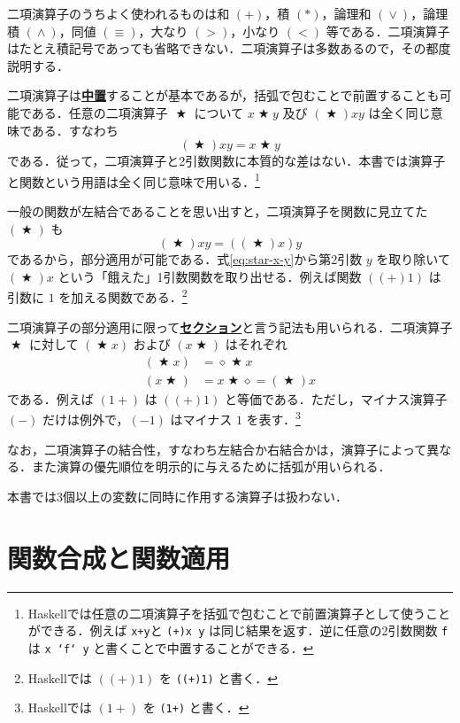\documentclass[a4paper,twocolumn]{jsbook}
\newcommand{\programminglanguage}[1]{\textsf{#1}}
\newcommand{\haskell}{\programminglanguage{Haskell}}
\newcommand{\keyword}[1]{{\underline{\textbf{#1}}}}
\newcommand{\code}[1]{\texttt{#1}}
\newcommand{\mAnonParam}{\diamond}
\DeclareMathOperator{\mBinOp}{\bigstar}
\DeclareMathOperator{\mLogicalAnd}{\wedge}
\DeclareMathOperator{\mLogicalOr}{\vee}
\begin{document}
二項演算子のうちよく使われるものは和 $(+)$，積 $(*)$，論理和 $(\mLogicalOr)$，論理積 $(\mLogicalAnd)$，同値 $(\equiv)$，大なり $(>)$，小なり $(<)$ 等である．二項演算子はたとえ積記号であっても省略できない．二項演算子は多数あるので，その都度説明する．

二項演算子は\keyword{中置}することが基本であるが，括弧で包むことで前置することも可能である．任意の二項演算子 $\mBinOp$ について $x\mBinOp y$ 及び $(\mBinOp)xy$ は全く同じ意味である．すなわち
\begin{equation}
\left(\mBinOp\right)xy=x\mBinOp y
\end{equation}
である．従って，二項演算子と2引数関数に本質的な差はない．本書では演算子と関数という用語は全く同じ意味で用いる．\footnote{\haskell では任意の二項演算子を括弧で包むことで前置演算子として使うことができる．例えば \code{x+y}と \code{(+)x y} は同じ結果を返す．逆に任意の2引数関数 \code{f}は \code{x `f` y} と書くことで中置することができる．}

一般の関数が左結合であることを思い出すと，二項演算子を関数に見立てた $(\mBinOp)$ も
\begin{equation}
\label{eq:star-x-y}
(\mBinOp)xy=((\mBinOp)x)y
\end{equation}
であるから，部分適用が可能である．式\eqref{eq:star-x-y}から第2引数 $y$ を取り除いて $(\mBinOp)x$ という「餓えた」1引数関数を取り出せる．例えば関数 $((+)1)$ は引数に $1$ を加える関数である．\footnote{\haskell では $((+)1)$ を \code{((+)1)} と書く．}

二項演算子の部分適用に限って\keyword{セクション}と言う記法も用いられる．二項演算子 $\mBinOp$ に対して $(\mBinOp x)$ および $(x\mBinOp)$ はそれぞれ
\begin{align}
(\mBinOp x)&=\mAnonParam\mBinOp x\\
(x\mBinOp)&=x\mBinOp\mAnonParam=(\mBinOp)x
\end{align}
である．例えば $(1+)$ は $((+)1)$ と等価である．ただし，マイナス演算子 $(-)$ だけは例外で，$(-1)$ はマイナス $1$ を表す．\footnote{\haskell では $(1+)$ を \code{(1+)} と書く．}

なお，二項演算子の結合性，すなわち左結合か右結合かは，演算子によって異なる．また演算の優先順位を明示的に与えるために括弧が用いられる．

本書では3個以上の変数に同時に作用する演算子は扱わない．

\section{関数合成と関数適用}
\end{document}
